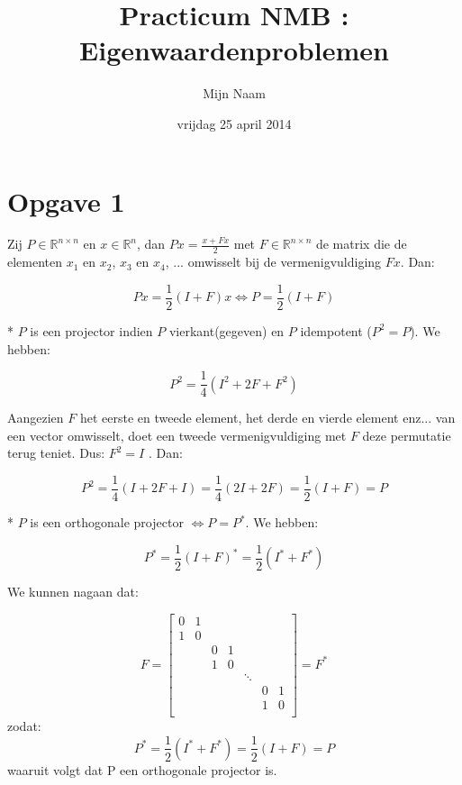 \documentclass[a4paper]{article}
\title{Practicum NMB : Eigenwaardenproblemen}
\author{Mijn Naam}
\date{vrijdag 25 april 2014}
\newcommand{\opgave}[1]{\section*{Opgave #1}}
\begin{document}
\maketitle


\opgave{1}

Zij $P \in \mathbb{R}^{n \times n} $ en $x \in \mathbb{R}^{n}$, dan $Px = \frac{x + Fx}{2}$ met $F \in \mathbb{R}^{n \times n}$ de matrix die de elementen $x_1$ en $x_2$, $x_3$ en $x_4$, ... omwisselt bij de vermenigvuldiging $Fx.$
Dan:

\begin{equation}
	Px = \frac{1}{2}(I + F)x \Leftrightarrow P = \frac{1}{2}(I+F)
\end{equation}
	
* $P$ is een projector indien $P$ vierkant(gegeven) en $P$ idempotent ($P^2 = P$).
We hebben:

\begin{equation}
	P^2 = \frac{1}{4}(I^2 + 2F + F^2)
\end{equation}

Aangezien $F$ het eerste en tweede element, het derde en vierde element enz... van een vector omwisselt, doet een tweede vermenigvuldiging met $F$ deze permutatie terug teniet. 
Dus: $F^2 = I$ . Dan:

\begin{equation}
	P^2 = \frac{1}{4}(I + 2F + I) = \frac{1}{4}(2I + 2F) = \frac{1}{2}(I + F) = P
\end{equation}

* $P$ is een orthogonale projector $\Leftrightarrow P = P^{*}$.
We hebben:

\begin{equation}
	P^* = \frac{1}{2}(I + F)^* = \frac{1}{2}(I^* + F^*)
\end{equation}

We kunnen nagaan dat:

\begin{equation}
	F = \begin{bmatrix}
		0 & 1 &  \\
  		1 & 0 &  \\
  		  &   & 0 & 1\\
  		  &   & 1 & 0\\
  		  &   &   &  & \ddots &  \\
  		  &   &   &  & 	 & 0 & 1 \\
  		  &   &   &  &   & 1 & 0 \\
		\end{bmatrix}  = F^*
\end{equation}
zodat:
\begin{equation}
	P^* = \frac{1}{2}(I^* + F^*) = \frac{1}{2}(I + F) = P
\end{equation}
waaruit volgt dat P een orthogonale projector is.
\end{document}
